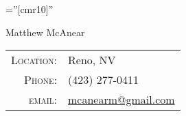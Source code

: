 \documentclass[a4paper,10pt]{article}
\begin{document}
\pagestyle{empty} %

\font\fb=''[cmr10]'' %

\par{\centering
		{\Huge Matthew McAnear
	}\bigskip\par}

\begin{tabular}{rl}
    \textsc{Location:}  & Reno, NV\\
    \textsc{Phone:}     & (423) 277-0411\\
    \textsc{email:}     & \href{mailto:mcanearm@gmail.com}{mcanearm@gmail.com}
\end{tabular}



\end{document}
